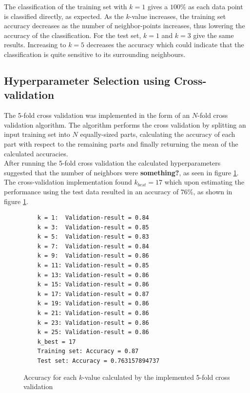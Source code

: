 \documentclass[a4paper]{article}
\begin{document}
The classification of the training set with $k=1$ gives a $100\%$ as each data point is classified directly, as expected. As the $k$-value increases, the training set accuracy decreases as the number of neighbor-points increases, thus lowering the accuracy of the classification. For the test set, $k=1$ and $k=3$ give the same results. Increasing to $k=5$ decreases the accuracy which could indicate that the classification is quite sensitive to its surrounding neighbours.


\subsection{Hyperparameter Selection using Cross-validation}
The 5-fold cross validation was implemented in the form of an $N$-fold cross validation algorithm. The algorithm performs the cross validation by splitting an input training set into $N$ equally-sized parts, calculating the accuracy of each part with respect to the remaining parts and finally returning the mean of the calculated accuracies.\\

After running the 5-fold cross validation the calculated hyperparameters suggested that the number of neighbors were \textbf{something?}, as seen in figure \ref{fig:5-fold_results}.\\

The cross-validation implementation found $k_{best} = 17$ which upon estimating the performance using the test data resulted in an accuracy of $76\%$, as shown in figure \ref{fig:5-fold_results}. 

\begin{figure}[H]
	\begin{lstlisting}
	k = 1:  Validation-result = 0.84
	k = 3:  Validation-result = 0.85
	k = 5:  Validation-result = 0.83
	k = 7:  Validation-result = 0.84
	k = 9:  Validation-result = 0.86
	k = 11: Validation-result = 0.85
	k = 13: Validation-result = 0.86
	k = 15: Validation-result = 0.86
	k = 17: Validation-result = 0.87
	k = 19: Validation-result = 0.86
	k = 21: Validation-result = 0.86
	k = 23: Validation-result = 0.86
	k = 25: Validation-result = 0.86
	k_best = 17
	Training set: Accuracy = 0.87
	Test set: Accuracy = 0.763157894737
	\end{lstlisting}
	\caption{Accuracy for each $k$-value calculated by the implemented 5-fold cross validation}
	\label{fig:5-fold_results}
\end{figure}
\end{document}

